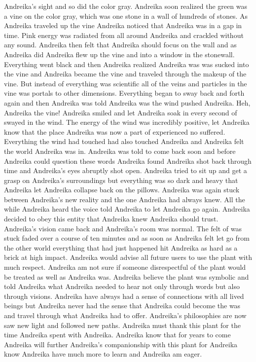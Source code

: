 \documentclass[12pt]{book}
\begin{document}
Andreika's sight and so did the color gray. Andreika soon realized the green was a vine on the color gray, which was one stone in a wall of hundreds of stones. As Andreika traveled up the vine Andreika noticed that Andreika was in a gap in time. Pink energy was radiated from all around Andreika and crackled without any sound. Andreika then felt that Andreika should focus on the wall and as Andreika did Andreika flew up the vine and into a window in the stonewall. Everything went black and then Andreika realized Andreika was was sucked into the vine and Andreika became the vine and traveled through the makeup of the vine. But instead of everything was scientific all of the veins and particles in the vine was portals to other dimensions. Everything began to sway back and forth again and then Andreika was told Andreika was the wind pushed Andreika. Heh, Andreika the vine! Andreika smiled and let Andreika soak in every second of swayed in the wind. The energy of the wind was incredibly positive, let Andreika know that the place Andreika was now a part of experienced no suffered. Everything the wind had touched had also touched Andreika and Andreika felt the world Andreika was in. Andreika was told to come back soon and before Andreika could question these words Andreika found Andreika shot back through time and Andreika's eyes abruptly shot open. Andreika tried to sit up and get a grasp on Andreika's surroundings but everything was so dark and heavy that Andreika let Andreika collapse back on the pillows. Andreika was again stuck between Andreika's new reality and the one Andreika had always knew. All the while Andreika heard the voice told Andreika to let Andreika go again. Andreika decided to obey this entity that Andreika knew Andreika should trust. Andreika's vision came back and Andreika's room was normal. The felt of was stuck faded over a course of ten minutes and as soon as Andreika felt let go from the other world everything that had just happened hit Andreika as hard as a brick at high impact. Andreika would advise all future users to use the plant with much respect. Andreika am not sure if someone disrespectful of the plant would be treated as well as Andreika was. Andreika believe the plant was symbolic and told Andreika what Andreika needed to hear not only through words but also through visions. Andreika have always had a sense of connections with all lived beings but Andreika never had the sense that Andreika could become the was and travel through what Andreika had to offer. Andreika's philosophies are now saw new light and followed new paths. Andreika must thank this plant for the time Andreika spent with Andreika. Andreika know that for years to come Andreika will further Andreika's companionship with this plant for Andreika know Andreika have much more to learn and Andreika am eager.
\end{document}
